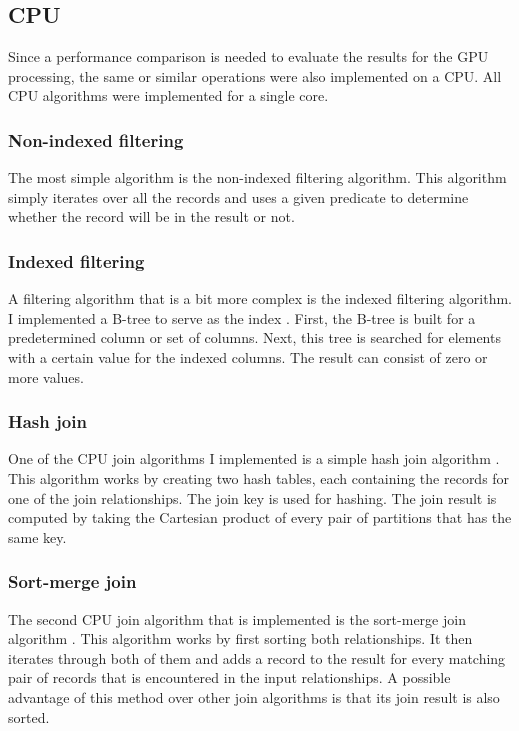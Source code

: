 \documentclass[a4paper,titlepage]{article}
\begin{document}
\subsection{CPU}
\label{sec:cpu-implementation}
Since a performance comparison is needed to evaluate the results for the GPU processing, the same or similar operations were also implemented on a CPU. All CPU algorithms were implemented for a single core.

\subsubsection{Non-indexed filtering}
The most simple algorithm is the non-indexed filtering algorithm. This algorithm simply iterates over all the records and uses a given predicate to determine whether the record will be in the result or not.

\subsubsection{Indexed filtering}
A filtering algorithm that is a bit more complex is the indexed filtering algorithm. I implemented a B-tree to serve as the index \cite{comer1979}. First, the B-tree is built for a predetermined column or set of columns. Next, this tree is searched for elements with a certain value for the indexed columns. The result can consist of zero or more values.

\subsubsection{Hash join}
One of the CPU join algorithms I implemented is a simple hash join algorithm \cite{dewitt1985}. This algorithm works by creating two hash tables, each containing the records for one of the join relationships. The join key is used for hashing. The join result is computed by taking the Cartesian product of every pair of partitions that has the same key.

\subsubsection{Sort-merge join}
The second CPU join algorithm that is implemented is the sort-merge join algorithm \cite{blasgen1977}. This algorithm works by first sorting both relationships. It then iterates through both of them and adds a record to the result for every matching pair of records that is encountered in the input relationships. A possible advantage of this method over other join algorithms is that its join result is also sorted.
\end{document}
